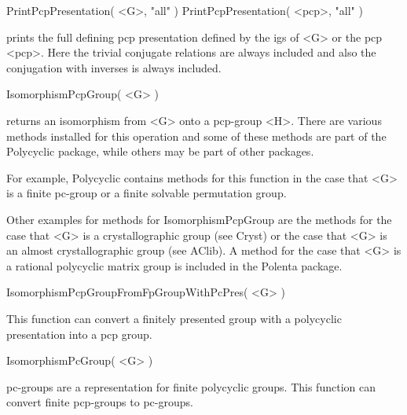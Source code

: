 \> PrintPcpPresentation( <G>, "all" )
\> PrintPcpPresentation( <pcp>, "all" )

prints the full defining pcp presentation defined by the igs of <G> or the 
pcp <pcp>. Here the trivial conjugate relations are always included and also
the conjugation with inverses is always included.


\>IsomorphismPcpGroup( <G> )

returns an isomorphism from <G> onto a pcp-group <H>. There are various
methods installed for this operation and some of these methods are part
of the Polycyclic package, while others may be part of other packages. 

For example, Polycyclic contains methods for this function in the case
that <G> is a finite pc-group or a finite solvable permutation group. 

Other examples for methods for IsomorphismPcpGroup are the methods for
the case that <G> is a crystallographic group (see Cryst) or the case
that <G> is an almost crystallographic group (see AClib). A method for 
the case that <G> is a rational polycyclic matrix group is included in 
the Polenta package. 

\>IsomorphismPcpGroupFromFpGroupWithPcPres( <G> )

This function can convert a finitely presented group with a polycyclic 
presentation into a pcp group.

\>IsomorphismPcGroup( <G> )

pc-groups are a representation for finite polycyclic groups. This function
can convert finite pcp-groups to pc-groups.

